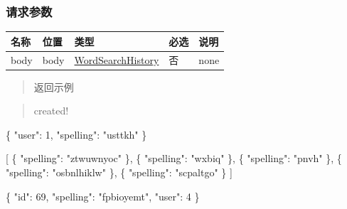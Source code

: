 \documentclass[
]{article}
\newenvironment{Shaded}{}{}
\newcommand{\DataTypeTok}[1]{\textcolor[rgb]{0.56,0.13,0.00}{#1}}
\newcommand{\DecValTok}[1]{\textcolor[rgb]{0.25,0.63,0.44}{#1}}
\newcommand{\FunctionTok}[1]{\textcolor[rgb]{0.02,0.16,0.49}{#1}}
\newcommand{\OtherTok}[1]{\textcolor[rgb]{0.00,0.44,0.13}{#1}}
\newcommand{\StringTok}[1]{\textcolor[rgb]{0.25,0.44,0.63}{#1}}
\begin{document}
\hypertarget{ux8bf7ux6c42ux53c2ux6570-34}{%
\subsubsection{请求参数}\label{ux8bf7ux6c42ux53c2ux6570-34}}

\begin{longtable}[]{@{}lllll@{}}
\toprule
名称 & 位置 & 类型 & 必选 & 说明 \\
\midrule
\endhead
body & body &
\protect\hyperlink{schemawordsearchhistory}{WordSearchHistory} & 否 &
none \\
\bottomrule
\end{longtable}

\begin{quote}
返回示例
\end{quote}

\begin{quote}
created!
\end{quote}

\begin{Shaded}
\begin{Highlighting}[]
\FunctionTok{\{}
  \DataTypeTok{"user"}\FunctionTok{:} \DecValTok{1}\FunctionTok{,}
  \DataTypeTok{"spelling"}\FunctionTok{:} \StringTok{"usttkh"}
\FunctionTok{\}}
\end{Highlighting}
\end{Shaded}

\begin{Shaded}
\begin{Highlighting}[]
\OtherTok{[}
  \FunctionTok{\{}
    \DataTypeTok{"spelling"}\FunctionTok{:} \StringTok{"ztwuwnyoc"}
  \FunctionTok{\}}\OtherTok{,}
  \FunctionTok{\{}
    \DataTypeTok{"spelling"}\FunctionTok{:} \StringTok{"wxbiq"}
  \FunctionTok{\}}\OtherTok{,}
  \FunctionTok{\{}
    \DataTypeTok{"spelling"}\FunctionTok{:} \StringTok{"pnvh"}
  \FunctionTok{\}}\OtherTok{,}
  \FunctionTok{\{}
    \DataTypeTok{"spelling"}\FunctionTok{:} \StringTok{"osbnlhiklw"}
  \FunctionTok{\}}\OtherTok{,}
  \FunctionTok{\{}
    \DataTypeTok{"spelling"}\FunctionTok{:} \StringTok{"scpaltgo"}
  \FunctionTok{\}}
\OtherTok{]}
\end{Highlighting}
\end{Shaded}

\begin{Shaded}
\begin{Highlighting}[]
\FunctionTok{\{}
  \DataTypeTok{"id"}\FunctionTok{:} \DecValTok{69}\FunctionTok{,}
  \DataTypeTok{"spelling"}\FunctionTok{:} \StringTok{"fpbioyemt"}\FunctionTok{,}
  \DataTypeTok{"user"}\FunctionTok{:} \DecValTok{4}
\FunctionTok{\}}
\end{Highlighting}
\end{Shaded}
\end{document}
